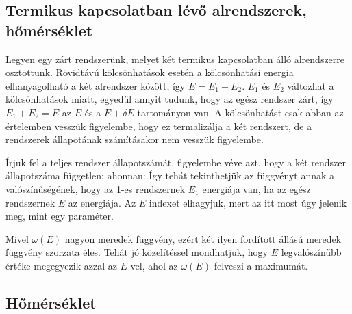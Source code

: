   \subsection{Termikus kapcsolatban lévő alrendszerek, hőmérséklet}
   
   Legyen egy zárt rendszerünk, melyet két termikus kapcsolatban álló alrendszerre osztottunk. Rövidtávú kölcsönhatások esetén a kölcsönhatási energia elhanyagolható a két alrendszer között, így $E=E_1+E_2$. $E_1$ és $E_2$ változhat a kölcsönhatások miatt, egyedül annyit tudunk, hogy az egész rendszer zárt, így $E_1+E_2=E$ az $E$ és a $E+\delta E$ tartományon van. A kölcsönhatást csak abban az értelemben vesszük figyelembe, hogy ez termalizálja a két rendszert, de a rendszerek állapotának számításakor nem vesszük figyelembe.
   
   Írjuk fel a teljes rendszer állapotszámát, figyelembe véve azt, hogy a két rendszer állapotszáma független:
   ahonnan:
   Így tehát tekinthetjük az
   függvényt annak a valószínűségének, hogy az 1-es rendszernek $E_1$ energiája van, ha az egész rendszernek $E$ az energiája. Az $E$ indexet elhagyjuk, mert az itt most úgy jelenik meg, mint egy paraméter. 
   
   Mivel $\omega(E)$ nagyon meredek függvény, ezért két ilyen fordított állású meredek függvény szorzata éles. Tehát jó közelítéssel mondhatjuk, hogy $E$ legvalószínűbb értéke megegyezik azzal az $E$-vel, ahol az $\omega(E)$ felveszi a maximumát.
   
  \subsection{Hőmérséklet}
   

